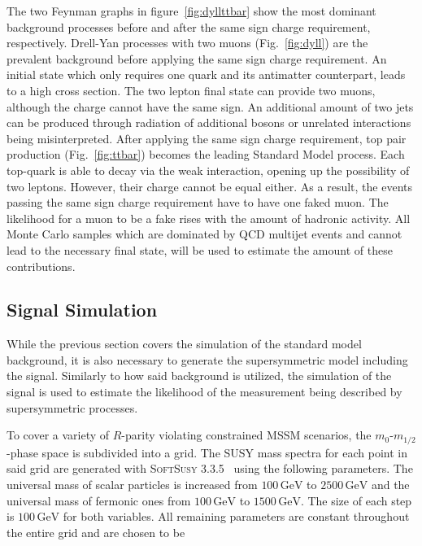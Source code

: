 The two Feynman graphs in figure~\ref{fig:dyllttbar} show the most dominant background processes before and after the same sign charge requirement, respectively. Drell-Yan processes with two muons (Fig.~\ref{fig:dyll}) are the prevalent background before applying the same sign charge requirement. An initial state which only requires one quark and its antimatter counterpart, leads to a high cross section. The two lepton final state can provide two muons, although the charge cannot have the same sign. An additional amount of two jets can be produced through radiation of additional bosons or unrelated interactions being misinterpreted. After applying the same sign charge requirement, top pair production (Fig.~\ref{fig:ttbar}) becomes the leading Standard Model process. Each top-quark is able to decay via the weak interaction, opening up the possibility of two leptons. However, their charge cannot be equal either. As a result, the events passing the same sign charge requirement have to have one faked muon. The likelihood for a muon to be a fake rises with the amount of hadronic activity. All Monte Carlo samples which are dominated by QCD multijet events and cannot lead to the necessary final state, will be used to estimate the amount of these contributions.


\subsection{Signal Simulation}
\label{sec:signal-sim}

While the previous section covers the simulation of the standard model background, it is also necessary to generate the supersymmetric model including the signal. Similarly to how said background is utilized, the simulation of the signal is used to estimate the likelihood of the measurement being described by supersymmetric processes.

To cover a variety of $R$-parity violating constrained MSSM scenarios, the $m_0$-$m_{1/2}$-phase space is subdivided into a grid. The SUSY mass spectra for each point in said grid are generated with \textsc{SoftSusy 3.3.5}~\cite{softsusy,sonnegueth} using the following parameters. The universal mass of scalar particles is increased from $100\,\text{GeV}$ to $2500\,\text{GeV}$ and the universal mass of fermonic ones from $100\,\text{GeV}$ to $1500\,\text{GeV}$. The size of each step is $100\,\text{GeV}$ for both variables. All remaining parameters are constant throughout the entire grid and are chosen to be


